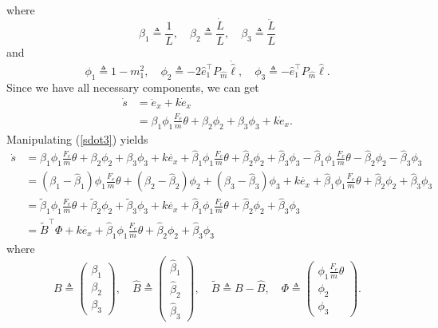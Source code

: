 where
\begin{equation}
\beta_1 \triangleq \frac{1}{L},\quad \beta_2 \triangleq \frac{\dot{L}}{L}, \quad \beta_3 \triangleq \frac{\ddot{L}}{L}
\end{equation}
and
\begin{equation}
\phi_1 \triangleq 1-m_1^2,\quad \phi_2 \triangleq -2\hat{e}_1^{\top}P_{\hat{m}}\dot{\hat{\ell}}, \quad \phi_3 \triangleq -\hat{e}_1^{\top}P_{\hat{m}}\hat{\ell}.
\end{equation}
Since we have all necessary components, we can get 
\begin{align}
\dot{s}&=\ddot{e}_x+k\dot{e}_x
\\&=\beta_1\phi_1\frac{F_e}{m}\theta+\beta_2\phi_2+\beta_3\phi_3+k\dot{e}_x.
\label{sdot3}
\end{align}
Manipulating (\ref{sdot3}) yields
\begin{align}
\dot{s}&=\beta_1\phi_1\frac{F_e}{m}\theta+\beta_2\phi_2+\beta_3\phi_3+k\dot{e_x}+\hat{\beta}_1\phi_1\frac{F_e}{m}\theta+\hat{\beta}_2\phi_2+\hat{\beta}_3\phi_3-\hat{\beta}_1\phi_1\frac{F_e}{m}\theta-\hat{\beta}_2\phi_2-\hat{\beta}_3\phi_3
\\&=(\beta_1-\hat{\beta}_1)\phi_1\frac{F_e}{m}\theta+(\beta_2-\hat{\beta}_2)\phi_2+(\beta_3-\hat{\beta}_3)\phi_3+k\dot{e_x}+\hat{\beta}_1\phi_1\frac{F_e}{m}\theta+\hat{\beta}_2\phi_2+\hat{\beta}_3\phi_3
\\&=\tilde{\beta}_1\phi_1\frac{F_e}{m}\theta+\tilde{\beta}_2\phi_2+\tilde{\beta}_3\phi_3+k\dot{e_x}+\hat{\beta}_1\phi_1\frac{F_e}{m}\theta+\hat{\beta}_2\phi_2+\hat{\beta}_3\phi_3
\\&=\tilde{B}^\top\Phi+k\dot{e_x}+\hat{\beta}_1\phi_1\frac{F_e}{m}\theta+\hat{\beta}_2\phi_2+\hat{\beta}_3\phi_3
\end{align}
where 
\begin{equation}
B \triangleq \begin{pmatrix}
\beta_1 \\ \beta_2 \\ \beta_3
\end{pmatrix}, \quad
\hat{B} \triangleq \begin{pmatrix} \hat{\beta}_1 \\ \hat{\beta}_2 \\ \hat{\beta}_3 \end{pmatrix}, \quad
\tilde{B} \triangleq B-\hat{B}, \quad 
\Phi \triangleq \begin{pmatrix} \phi_1\frac{F_e}{m}\theta \\ \phi_2 \\ \phi_3 \end{pmatrix}.
\end{equation}
